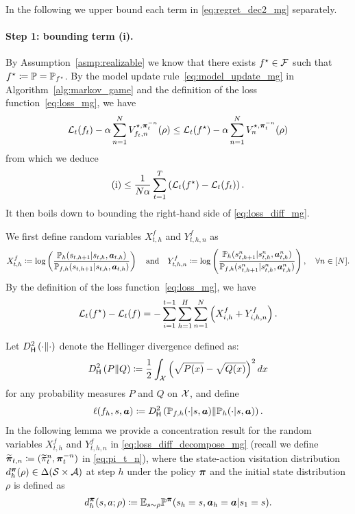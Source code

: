 In the following we upper bound each term in \eqref{eq:regret_dec2_mg} separately.

\paragraph{Step 1: bounding term (i).} 
By Assumption~\ref{asmp:realizable} we know that there exists $f^\star\in{\mathcal{F}}$ such that $f^\star\coloneqq {\mathbb P} = {\mathbb P}_{f^\star}$.
By the model update rule~\eqref{eq:model_update_mg} in Algorithm~\ref{alg:markov_game} and the definition of the loss function~\eqref{eq:loss_mg}, we have
\begin{align*}
    {\mathcal{L}}_t(f_t)-\alpha\sum_{n=1}^N V_{f_t,n}^{\star,{\bm{\pi}}_t^{-n}}(\rho) \leq {\mathcal{L}}_t(f^\star)-\alpha\sum_{n=1}^N V_{n}^{\star,{\bm{\pi}}_t^{-n}}(\rho)
\end{align*}
from which we deduce
\begin{align}\label{eq:loss_diff_mg}
   \mathrm{(i)} \leq \frac{1}{N\alpha}\sum_{t=1}^T\left({\mathcal{L}}_t(f^\star)-{\mathcal{L}}_t(f_t)\right).
\end{align}
It then boils down to bounding the right-hand side of \eqref{eq:loss_diff_mg}. 

We first define random variables $X_{t,h}^f$ and $Y_{t,h,n}^f$ as
\begin{align}\label{eq:X_t_mg}
    X_{t,h}^f\coloneqq \log \left(\frac{{\mathbb P}_h(s_{t,h+1}|s_{t,h},{\bm{a}}_{t,h})}{{\mathbb P}_{f,h}(s_{t,h+1}|s_{t,h},{\bm{a}}_{t,h})}\right)\quad\text{and}\quad Y_{t,h,n}^f\coloneqq \log \left(\frac{{\mathbb P}_h(s_{t,h+1}^n|s_{t,h}^n,{\bm{a}}_{t,h}^n)}{{\mathbb P}_{f,h}(s_{t,h+1}^n|s_{t,h}^n,{\bm{a}}_{t,h}^n)}\right),\quad \forall n\in[N].
\end{align}
By the definition of the loss function~\eqref{eq:loss_mg}, we have
\begin{align}\label{eq:loss_diff_decompose_mg}
    {\mathcal{L}}_t(f^\star)-{\mathcal{L}}_t(f) = -\sum_{i=1}^{t-1}\sum_{h=1}^H\sum_{n=1}^N \left(X_{i,h}^f+Y_{i,h,n}^f\right).
\end{align}

Let $D_{\mathsf{H}}^2\left(\cdot\|\cdot\right)$ denote the Hellinger divergence defined as:
\begin{align}\label{eq:Hellinger}
    D_{\mathsf{H}}^2\left(P\|Q\right)\coloneqq \frac{1}{2}\int_{\mathcal{X}}\left(\sqrt{P(x)}-\sqrt{Q(x)}\right)^2 dx 
\end{align}
for any probability measures $P$ and $Q$ on ${\mathcal{X}}$, and define
\begin{align}\label{eq:Hellinger_loss}
    \ell(f_h,s,{\bm{a}})\coloneqq D_{\mathsf{H}}^2\left({\mathbb P}_{f,h}(\cdot|s,{\bm{a}})\|{\mathbb P}_h(\cdot|s,{\bm{a}})\right).
\end{align}
In the following lemma we provide a concentration result for the random variables $X_{t,h}^f$ and $Y_{t,h,n}^f$ in \eqref{eq:loss_diff_decompose_mg} (recall we define $\widetilde{{\bm{\pi}}}_{t,n}\coloneqq (\widetilde{\pi}_t^n, {\bm{\pi}}_t^{-n})$ in \eqref{eq:pi_t_n}), where  the state-action visitation distribution $d_h^{{\bm{\pi}}}(\rho)\in\Delta({\mathcal{S}}\times{\mathcal{A}})$ at step $h$ under the policy ${\bm{\pi}}$ and the initial state distribution $\rho$ is defined as
\begin{align}\label{eq:state_action_visitation_finite}
    d_{h}^{{\bm{\pi}}}(s,a ; \rho)\coloneqq \mathbb{E}_{s\sim\rho}{\mathbb P}^{{\bm{\pi}}}(s_h=s,{\bm{a}}_h={\bm{a}}|s_1=s).
\end{align}

